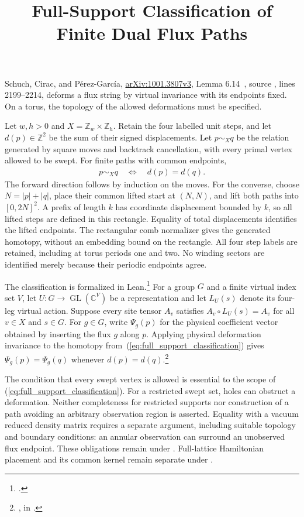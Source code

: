 \documentclass{article}
\title{Full-Support Classification of Finite Dual Flux Paths}
\author{}
\date{}
\begin{document}
\maketitle
{}

Schuch, Cirac, and P\'erez-Garc\'ia,
\href{https://arxiv.org/abs/1001.3807v3}{arXiv:1001.3807v3},
Lemma 6.14~\cite[Lemma~6.14]{Schuch2010PEPS}, source , lines 2199--2214,
deforms a flux string by virtual invariance with its endpoints fixed.
On a torus, the topology of the allowed deformations must be specified.

Let $w,h>0$ and $X=\mathbb Z_w\times\mathbb Z_h$. Retain the four labelled unit steps,
and let $d(p)\in\mathbb Z^2$ be the sum of their signed displacements.
Let $p\sim_Xq$ be the relation generated by square moves and backtrack
cancellation, with every primal vertex allowed to be swept. For finite paths
with common endpoints,
\begin{align}
    p\sim_Xq\quad\Longleftrightarrow\quad d(p)=d(q).
    \label{eq:full_support_classification}
\end{align}
The forward direction follows by induction on the moves. For the converse,
choose $N=|p|+|q|$, place their common lifted start at $(N,N)$, and lift both
paths into $[0,2N]^2$. A prefix of length $k$ has coordinate displacement
bounded by $k$, so all lifted steps are defined in this rectangle. Equality
of total displacements identifies the lifted endpoints. The rectangular
comb normalizer gives the generated homotopy, without an embedding bound
on the rectangle. All four step labels are retained, including at torus
periods one and two. No winding sectors are identified merely because
their periodic endpoints agree.

The classification is formalized in Lean.\footnote{
    .}
For a group $G$ and a finite virtual index set $V$, let
$U:G\to\operatorname{GL}(\mathbb C^V)$ be a representation and let $L_U(s)$
denote its four-leg virtual action. Suppose every site tensor $A_v$ satisfies
$A_v\circ L_U(s)=A_v$ for all $v\in X$ and $s\in G$.
For $g\in G$, write $\Psi_g(p)$ for the physical coefficient vector obtained
by inserting the flux $g$ along $p$. Applying physical deformation invariance
to the homotopy from~(\ref{eq:full_support_classification}) gives
$\Psi_g(p)=\Psi_g(q)$ whenever $d(p)=d(q)$.\footnote{
    ,
    in .}

The condition that every swept vertex is allowed is essential to the scope
of (\ref{eq:full_support_classification}). For a restricted swept set, holes
can obstruct a deformation. Neither completeness for restricted supports
nor construction of a path avoiding an arbitrary observation region is
asserted. Equality with a vacuum reduced density matrix requires a separate
argument, including suitable topology and boundary conditions: an annular
observation can surround an unobserved flux endpoint. These obligations
remain under . Full-lattice Hamiltonian placement and its
common kernel remain separate under .


\end{document}
